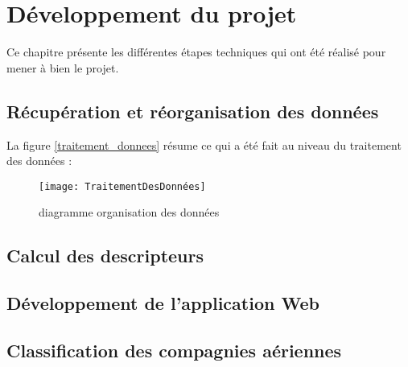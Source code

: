 \chapter*{Développement du projet}
\label{sec:developpement}

Ce chapitre présente les différentes étapes techniques qui ont été réalisé pour mener à bien le projet. 

\section*{Récupération et réorganisation des données}

La figure \ref{traitement_donnees} résume ce qui a été fait au niveau du traitement des données : 

\begin{figure}[!h]
	\centering
	\texttt{[image: TraitementDesDonnées]}
	\caption{diagramme organisation des données}
	\label{fig:traitement_donnees}
\end{figure}

\section*{Calcul des descripteurs}

\section*{Développement de l'application Web}

\section*{Classification des compagnies aériennes}
